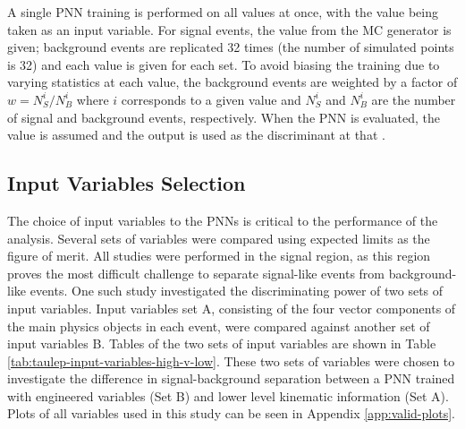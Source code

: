 			A single \gls{PNN} training is performed on all \mHpm values at once, with the \mHpm value being taken as an input variable. For signal events, the \mHpm value from the \gls{MC} generator is given; background events are replicated 32 times (the number of simulated \mHpm points is 32) and each \mHpm value is given for each set. To avoid biasing the training due to varying statistics at each \mHpm value, the background events are weighted by a factor of $w = N^{i}_{S}/N^{i}_{B}$ where $i$ corresponds to a given \mHpm value and $N^{i}_{S}$ and $N^{i}_{B}$ are the number of signal and background events, respectively. When the \gls{PNN} is evaluated, the \mHpm value is assumed and the output is used as the discriminant at that \mHpm.

		\subsection{Input Variables Selection}\label{ssec:input-variables}
			The choice of input variables to the \glspl{PNN} is critical to the performance of the analysis. Several sets of variables were compared using expected limits as the figure of merit. All studies were performed in the \taulep signal region, as this region proves the most difficult challenge to separate signal-like events from background-like events. One such study investigated the discriminating power of two sets of input variables. Input variables set A, consisting of the four vector components of the main physics objects in each event, were compared against another set of input variables B. Tables of the two sets of input variables are shown in Table \ref{tab:taulep-input-variables-high-v-low}. These two sets of variables were chosen to investigate the difference in signal-background separation between a \gls{PNN} trained with engineered variables (Set B) and lower level kinematic information (Set A). Plots of all variables used in this study can be seen in Appendix \ref{app:valid-plots}.

